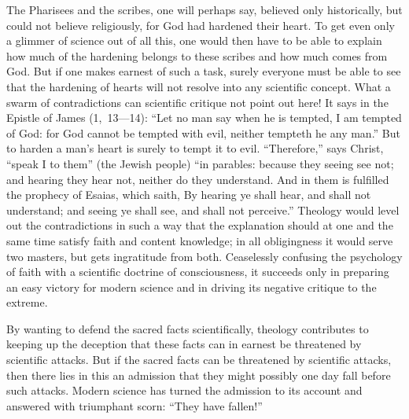 \documentclass[12pt]{book}
\newcommand{\opage}[1]{\marginnote{\footnotesize\textit{[#1]}}}
\begin{document}
The Pharisees and the scribes, one will perhaps
\opage{85}\setcounter{footnote}{0}%
say, believed only historically, but could not believe religiously, for
God had hardened their heart. To get even only a glimmer of science out
of all this, one would then have to be able to explain how much of the
hardening belongs to these scribes and how much comes from God. But if
one makes earnest of such a task, surely everyone must be able to see
that the hardening of hearts will not resolve into any scientific
concept. What a swarm of contradictions can scientific critique not
point out here! It says in the Epistle of James (1,~13---14): ``Let no
man say when he is tempted, I am tempted of God: for God cannot be
tempted with evil, neither tempteth he any man.'' But to harden a man's
heart is surely to tempt it to evil. ``Therefore,'' says Christ, ``speak
I to them'' (the Jewish people) ``in parables: because they seeing see
not; and hearing they hear not, neither do they understand. And in them
is fulfilled the prophecy of Esaias, which saith, By hearing ye shall
hear, and shall not understand; and seeing ye shall see, and shall not
perceive.'' Theology would level out the contradictions in such a way
that the explanation should at one and the same time satisfy faith and
content knowledge; in all obligingness it would serve two masters, but
gets ingratitude from both. Ceaselessly confusing the psychology of
faith with a scientific doctrine of consciousness, it succeeds only in
preparing an easy victory for modern science and in driving its negative
critique to the extreme.

By wanting to defend the sacred facts scientifically, theology
contributes to keeping up the deception that these facts can in earnest
be threatened by scientific attacks. But if the sacred facts can be
threatened by scientific attacks, then there lies in this an admission
that they might possibly one day fall before such attacks. Modern
science
\opage{86}\setcounter{footnote}{0}%
has turned the admission to its account and answered with triumphant
scorn: ``They have fallen!''
\end{document}
